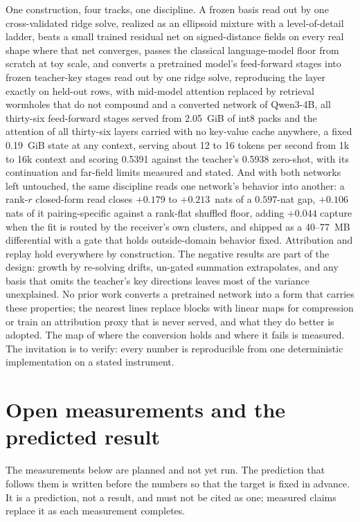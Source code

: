 \documentclass[11pt]{article}
\begin{document}
One construction, four tracks, one discipline. A frozen basis read
out by one cross-validated ridge solve, realized as an ellipsoid
mixture with a level-of-detail ladder, beats a small trained
residual net on signed-distance fields on every real shape where
that net converges, passes the classical language-model floor from
scratch at toy scale, and converts a pretrained model's
feed-forward stages into frozen teacher-key stages read out by one
ridge solve, reproducing the layer exactly on held-out rows, with
mid-model attention replaced by retrieval wormholes that do not
compound and a converted network of Qwen3-4B, all
thirty-six feed-forward stages served from 2.05~GiB of int8
packs and the attention of all thirty-six layers carried with no
key-value cache anywhere, a fixed 0.19~GiB state at any context,
serving about 12 to 16 tokens per second from 1k to 16k context
and scoring 0.5391 against the teacher's 0.5938 zero-shot, with
its continuation and far-field limits measured and stated. And
with both networks left untouched, the same discipline reads one
network's behavior into another: a rank-$r$ closed-form read
closes $+0.179$ to $+0.213$~nats of a $0.597$-nat gap, $+0.106$
nats of it pairing-specific against a rank-flat shuffled floor,
adding $+0.044$ capture when the fit is routed by the receiver's
own clusters, and shipped as a 40--77~MB differential with a
gate that holds outside-domain behavior fixed.
Attribution and replay hold everywhere by construction.
The negative results are part of the design: growth by re-solving
drifts, un-gated summation extrapolates, and any basis that omits
the teacher's key directions leaves most of the variance
unexplained. No prior work converts a pretrained network
into a form that carries these properties; the nearest lines
replace blocks with linear maps for compression or train an
attribution proxy that is never served, and what they do better is
adopted. The map of where the conversion holds and where it fails
is measured. The invitation is to verify: every number is
reproducible from one deterministic implementation on a stated
instrument.

\section*{Open measurements and the predicted result}

The measurements below are planned and not yet run. The prediction
that follows them is written before the numbers so that the target
is fixed in advance. It is a prediction, not a result, and must not
be cited as one; measured claims replace it as each measurement
completes.
\end{document}
